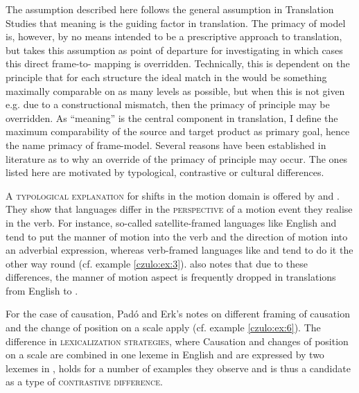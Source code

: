 \documentclass[output=paper]{LSP/langsci}
\begin{document}
The assumption described here follows the general assumption in Translation Studies that meaning is the guiding factor in translation. The primacy of  model is, however, by no means intended to be a prescriptive approach to translation, but takes this assumption as point of departure for investigating in which cases this direct frame-to- mapping is overridden. Technically, this is dependent on the principle that for each structure the ideal match in the  would be something maximally comparable on as many levels as possible, but when this is not given e.g. due to a constructional mismatch, then the primacy of  principle may be overridden. As ``meaning'' is the central component in translation, I define the maximum  comparability of the source and target product as primary goal, hence the name primacy of frame-model. Several reasons have been established in literature as to why an override of the primacy of  principle may occur. The ones listed here are motivated by typological, contrastive or cultural differences.

A \textsc{typological explanation} for  shifts in the motion domain is offered by \citet{Talmy2000} and \citet{Slobin1996, Slobin2004}. They show that languages differ in the \textsc{perspective} of a motion event they realise in the verb. For instance, so-called satellite-framed languages like English and  tend to put the manner of motion into the verb and the direction of motion into an adverbial expression, whereas verb-framed languages like  and  tend to do it the other way round (cf. example \ref{czulo:ex:3}). \citet{Slobin1996} also notes that due to these differences, the manner of motion aspect is frequently dropped in translations from English to .

For the case of causation, Padó and Erk's \citeyearpar{Pado2005} notes on different framing of causation and the change of position on a scale apply (cf. example \ref{czulo:ex:6}). The difference in \textsc{lexicalization strategies}, where Causation and changes of position on a scale are combined in one lexeme in English and are expressed by two lexemes in , holds for a number of examples they observe and is thus a candidate as a type of \textsc{contrastive difference}.
\end{document}
